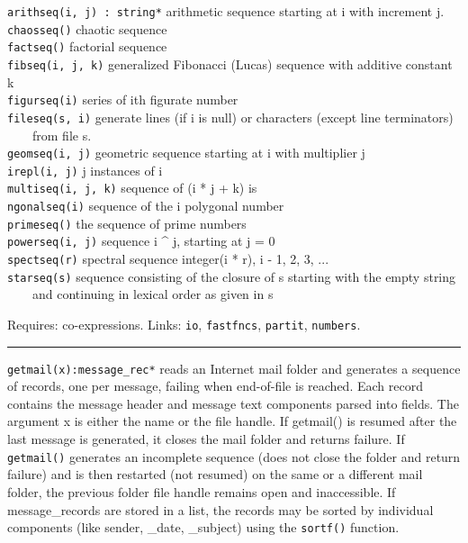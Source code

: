 \texttt{arithseq(i, j) : string*} arithmetic sequence starting at i with
increment j.\\
\texttt{chaosseq()} chaotic sequence\\
\texttt{factseq()} factorial sequence\\
\texttt{fibseq(i, j, k)} generalized Fibonacci (Lucas) sequence with
additive constant k\\
\texttt{figurseq(i)} series of i{\textquotesingle}th figurate
number\\
\texttt{fileseq(s, i)} generate lines (if i is null) or characters
(except line terminators)\\
 \ \ \ \ from file s.\\
\texttt{geomseq(i, j)} geometric sequence starting at i with multiplier
j\\
\texttt{irepl(i, j)} j instances of i\\
\texttt{multiseq(i, j, k)} sequence of (i * j + k)
i{\textquotesingle}s\\
\texttt{ngonalseq(i)} sequence of the i polygonal number\\
\texttt{primeseq()} the sequence of prime numbers\\
\texttt{powerseq(i, j)} sequence i \^{} j, starting at j = 0\\
\texttt{spectseq(r)} spectral sequence integer(i * r), i - 1, 2, 3,
...\\
\texttt{starseq(s)} sequence consisting of the closure of s starting
with the empty string\\
 \ \ \ \ and continuing in lexical order as given in s

Requires: co-expressions. Links: \texttt{io}, \texttt{fastfncs},
\texttt{partit}, \texttt{numbers}. 

\vspace{0.25cm}\hrule{}

\texttt{getmail(x):message\_rec*} reads an Internet mail folder and generates a sequence of records, one per message,
failing when end-of-file is reached. Each record contains the message
header and message text components parsed into fields. The argument x
is either the name or the file handle. If getmail() is resumed after
the last message is generated, it closes the mail folder and returns
failure. If \texttt{getmail()} generates an incomplete sequence (does
not close the folder and return failure) and is then restarted (not
resumed) on the same or a different mail folder, the previous folder
file handle remains open and inaccessible. If message\_records are
stored in a list, the records may be sorted by individual components
(like sender, \_date, \_subject) using the \texttt{sortf()} function.


